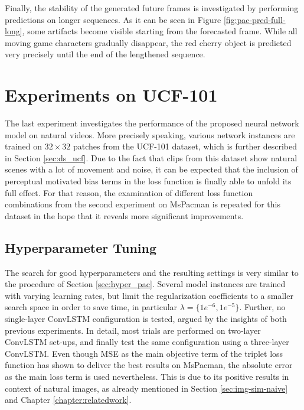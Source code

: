 Finally, the stability of the generated future frames is investigated by performing predictions on longer sequences. As it can be seen in Figure \ref{fig:pac-pred-full-long}, some artifacts become visible starting from the  forecasted frame. While all moving game characters gradually disappear, the red cherry object is predicted very precisely until the end of the lengthened sequence.













\section{Experiments on UCF-101}

The last experiment investigates the performance of the proposed neural network model on natural videos. More precisely speaking, various network instances are trained on $32 \times 32$ patches from the UCF-101 dataset, which is further described in Section \ref{sec:ds_ucf}. Due to the fact that clips from this dataset show natural scenes with a lot of movement and noise, it can be expected that the inclusion of perceptual motivated bias terms in the loss function is finally able to unfold its full effect. For that reason, the examination of different loss function combinations from the second experiment on MsPacman is repeated for this dataset in the hope that it reveals more significant improvements.

\subsection{Hyperparameter Tuning}

The search for good hyperparameters and the resulting settings is very similar to the procedure of Section \ref{sec:hyper_pac}. Several model instances are trained with varying learning rates, but limit the regularization coefficients to a smaller search space in order to save time, in particular $\lambda = \{1e^{-6}, 1e^{-5}\}$. Further, no single-layer ConvLSTM configuration is tested, argued by the insights of both previous experiments. In detail, most trials are performed on two-layer ConvLSTM set-ups, and finally test the same configuration using a three-layer ConvLSTM. Even though MSE as the main objective term of the triplet loss function has shown to deliver the best results on MsPacman, the absolute error as the main loss term is used nevertheless. This is due to its positive results in context of natural images, as already mentioned in Section \ref{sec:img-sim-naive} and Chapter \ref{chapter:relatedwork}.


